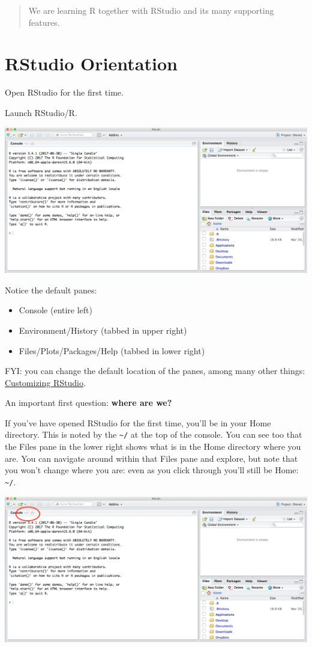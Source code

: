 \documentclass[]{book}
\providecommand{\tightlist}{%
  \setlength{\itemsep}{0pt}\setlength{\parskip}{0pt}}
\begin{document}
\begin{quote}
We are learning R together with RStudio and its many supporting features.
\end{quote}

\hypertarget{rstudio-orientation}{%
\section{RStudio Orientation}\label{rstudio-orientation}}

Open RStudio for the first time.

Launch RStudio/R.

\includegraphics[width=0.8\linewidth]{img/RStudio_IDE}

Notice the default panes:

\begin{itemize}
\tightlist
\item
  Console (entire left)
\item
  Environment/History (tabbed in upper right)
\item
  Files/Plots/Packages/Help (tabbed in lower right)
\end{itemize}

FYI: you can change the default location of the panes, among many other things: \href{https://support.rstudio.com/hc/en-us/articles/200549016-Customizing-RStudio}{Customizing RStudio}.

An important first question: \textbf{where are we?}

If you've have opened RStudio for the first time, you'll be in your Home directory. This is noted by the \texttt{\textasciitilde{}/} at the top of the console. You can see too that the Files pane in the lower right shows what is in the Home directory where you are. You can navigate around within that Files pane and explore, but note that you won't change where you are: even as you click through you'll still be Home: \texttt{\textasciitilde{}/}.

\includegraphics[width=0.8\linewidth]{img/RStudio_IDE_homedir}
\end{document}
